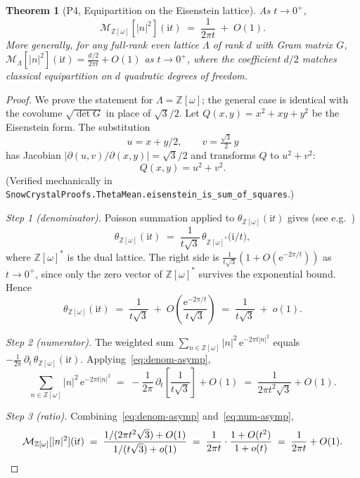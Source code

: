 \documentclass[11pt,letterpaper]{article}
\theoremstyle{plain}
\newtheorem{theorem}{Theorem}[section]
\theoremstyle{definition}
\newcommand{\Eisenstein}{\mathbb{Z}[\omega]}
\newcommand{\Lat}{\Lambda}
\newcommand{\tmean}[1]{\mathcal{M}_{\Lat}[#1]}
\newcommand{\tmeaneis}[1]{\mathcal{M}_{\Eisenstein}[#1]}
\newcommand{\e}{\mathrm{e}}
\begin{document}
\begin{theorem}[P4, Equipartition on the Eisenstein lattice]
\label{thm:P4}
As $t\to 0^{+}$,
\begin{equation}\label{eq:P4}
  \tmeaneis{|n|^2}(\mathrm{i} t)
  \;=\; \frac{1}{2\pi t}\;+\; O(1).
\end{equation}
More generally, for any full-rank even lattice $\Lat$ of rank $d$ with
Gram matrix $G$,
$\tmean{|n|^2}(\mathrm{i} t) = \frac{d/2}{2\pi t} + O(1)$ as
$t\to 0^+$, where the coefficient $d/2$ matches classical
equipartition on $d$ quadratic degrees of freedom.
\end{theorem}

\begin{proof}
We prove the statement for $\Lat=\Eisenstein$; the general case is
identical with the covolume $\sqrt{\det G}$ in place of
$\sqrt{3}/2$.  Let $Q(x,y) = x^2 + xy + y^2$ be the Eisenstein form.
The substitution
\[
  u = x + y/2, \qquad v = \tfrac{\sqrt{3}}{2}\,y
\]
has Jacobian $|\partial(u,v)/\partial(x,y)| = \sqrt{3}/2$ and
transforms $Q$ to $u^2 + v^2$:
\begin{equation}\label{eq:eis-factor}
  Q(x,y) = u^2 + v^2.
\end{equation}
(Verified mechanically in
\texttt{SnowCrystalProofs.ThetaMean.eisenstein\_is\_sum\_of\_squares}.)

\emph{Step 1 (denominator).}
Poisson summation applied to $\theta_{\Eisenstein}(\mathrm{i} t)$ gives
(see e.g.\ \cite[\S10.2]{IwaniecKowalski})
\begin{equation}\label{eq:poisson-eis}
  \theta_{\Eisenstein}(\mathrm{i} t)
    \;=\; \frac{1}{t\sqrt{3}}\,\theta_{\Eisenstein^*}\!\bigl(\mathrm{i}/t\bigr),
\end{equation}
where $\Eisenstein^*$ is the dual lattice.  The right side is
$\frac{1}{t\sqrt{3}}(1 + O(\e^{-2\pi/t}))$ as $t\to 0^+$, since only
the zero vector of $\Eisenstein^*$ survives the exponential bound.
Hence
\begin{equation}\label{eq:denom-asymp}
  \theta_{\Eisenstein}(\mathrm{i} t)
    \;=\; \frac{1}{t\sqrt{3}} \;+\; O\!\left(\frac{\e^{-2\pi/t}}{t\sqrt{3}}\right)
    \;=\; \frac{1}{t\sqrt{3}} \;+\; o(1).
\end{equation}

\emph{Step 2 (numerator).}
The weighted sum $\sum_{n\in\Eisenstein}|n|^2\,\e^{-2\pi t |n|^2}$
equals $-\frac{1}{2\pi}\,\partial_t\,
\theta_{\Eisenstein}(\mathrm{i} t)$.  Applying~\eqref{eq:denom-asymp},
\begin{equation}\label{eq:num-asymp}
  \sum_{n\in\Eisenstein}|n|^2\,\e^{-2\pi t |n|^2}
  \;=\; -\frac{1}{2\pi}\,\partial_t\!\left[\frac{1}{t\sqrt{3}}\right]
      + O(1)
  \;=\; \frac{1}{2\pi t^2\sqrt{3}} + O(1).
\end{equation}

\emph{Step 3 (ratio).}
Combining~\eqref{eq:denom-asymp} and~\eqref{eq:num-asymp},
\[
  \tmeaneis{|n|^2}(\mathrm{i} t)
  \;=\; \frac{1/(2\pi t^2\sqrt{3}) + O(1)}
             {1/(t\sqrt{3}) + o(1)}
  \;=\; \frac{1}{2\pi t}\cdot\frac{1+O(t^2)}{1+o(t)}
  \;=\; \frac{1}{2\pi t} + O(1). \qedhere
\]
\end{proof}
\end{document}
